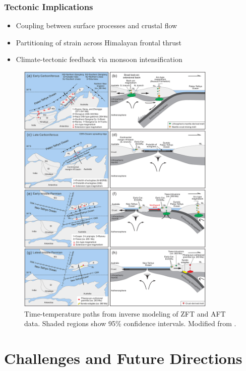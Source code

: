 \documentclass{article}
\begin{document}
\subsubsection*{Tectonic Implications}
\begin{itemize}
    \item Coupling between surface processes and crustal flow  
    \item Partitioning of strain across Himalayan frontal thrust  
    \item Climate-tectonic feedback via monsoon intensification
\end{itemize}

\begin{figure}[htbp]
    \centering
    \includegraphics[width=0.85\textwidth]{hefty_plot.jpg}
    \caption{Time-temperature paths from inverse modeling of ZFT and AFT data. Shaded regions show 95\% confidence intervals. Modified from \cite{King2020}.}
    \label{fig:hefty}
\end{figure}

\section{Challenges and Future Directions}
\end{document}
